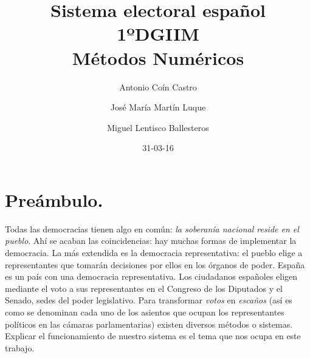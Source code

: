 \documentclass[11pt]{article}
\begin{document}
	\title{
		Sistema electoral español\\
		\vspace*{1\baselineskip}
		\large 1ºDGIIM \\
		Métodos Numéricos 
		\vspace*{1\baselineskip}
	} 
	
	\date{31-03-16}
	\author{Antonio Coín Castro \and José María Martín Luque \and Miguel Lentisco Ballesteros}
	
	
	
	\vfill
	
	\thispagestyle{empty}
	\fontsize{11}{14}
	
	\newpage
	
	\tableofcontents
	
	\newpage
	
	\section*{Preámbulo.}
	
	Todas las democracias tienen algo en común: \textit{la soberanía nacional reside en el pueblo}. Ahí se acaban las coincidencias: hay muchas formas de implementar la democracia. La más extendida es la democracia representativa: el pueblo elige a representantes que tomarán decisiones por ellos en los órganos de poder. España es un país con una democracia representativa. Los ciudadanos españoles eligen mediante el voto a sus representantes en el Congreso de los Diputados y el Senado, sedes del poder legislativo. Para transformar \textit{votos} en \textit{escaños} (así es como se denominan cada uno de los asientos que ocupan los representantes políticos en las cámaras parlamentarias) existen diversos métodos o sistemas. Explicar el funcionamiento de nuestro sistema es el tema que nos ocupa en este trabajo.
	
\end{document}
